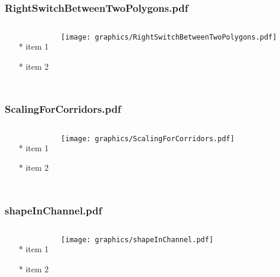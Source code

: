 \documentclass{beamer}
\begin{document}
\begin{frame} \frametitle{RightSwitchBetweenTwoPolygons.pdf}
    \begin{columns}[c]
        \begin{itemize}
            \item[*] item 1
            \item[*] item 2
        \end{itemize}
        \begin{minipage}{\linewidth}
            \begin{center}
            \texttt{[image: graphics/RightSwitchBetweenTwoPolygons.pdf]}
            \label{gfx:RightSwitchBetweenTwoPolygons.pdf}
            \end{center}
        \end{minipage}
    \end{columns}
\end{frame}
\begin{frame} \frametitle{ScalingForCorridors.pdf}
    \begin{columns}[c]
        \begin{itemize}
            \item[*] item 1
            \item[*] item 2
        \end{itemize}
        \begin{minipage}{\linewidth}
            \begin{center}
            \texttt{[image: graphics/ScalingForCorridors.pdf]}
            \label{gfx:ScalingForCorridors.pdf}
            \end{center}
        \end{minipage}
    \end{columns}
\end{frame}
\begin{frame} \frametitle{shapeInChannel.pdf}
    \begin{columns}[c]
        \begin{itemize}
            \item[*] item 1
            \item[*] item 2
        \end{itemize}
        \begin{minipage}{\linewidth}
            \begin{center}
            \texttt{[image: graphics/shapeInChannel.pdf]}
            \label{gfx:shapeInChannel.pdf}
            \end{center}
        \end{minipage}
    \end{columns}
\end{frame}
\end{document}
